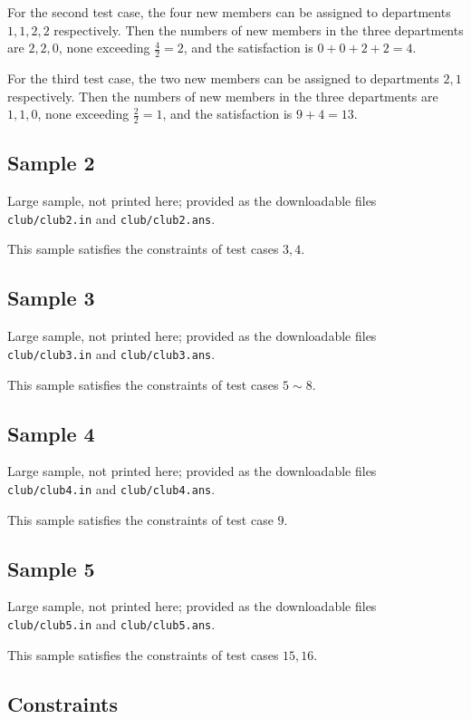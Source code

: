 \documentclass[11pt]{article}
\begin{document}
For the second test case, the four new members can be assigned to
departments $1, 1, 2, 2$ respectively.
Then the numbers of new members in the three departments are $2, 2, 0$,
none exceeding $\frac{4}{2} = 2$, and the satisfaction is
$0 + 0 + 2 + 2 = 4$.

For the third test case, the two new members can be assigned to
departments $2, 1$ respectively.
Then the numbers of new members in the three departments are $1, 1, 0$,
none exceeding $\frac{2}{2} = 1$, and the satisfaction is $9 + 4 = 13$.

\subsection*{Sample 2}

Large sample, not printed here;
provided as the downloadable files \texttt{club/club2.in} and \texttt{club/club2.ans}.

This sample satisfies the constraints of test cases $3, 4$.

\subsection*{Sample 3}

Large sample, not printed here;
provided as the downloadable files \texttt{club/club3.in} and \texttt{club/club3.ans}.

This sample satisfies the constraints of test cases $5 \sim 8$.

\subsection*{Sample 4}

Large sample, not printed here;
provided as the downloadable files \texttt{club/club4.in} and \texttt{club/club4.ans}.

This sample satisfies the constraints of test case $9$.

\subsection*{Sample 5}

Large sample, not printed here;
provided as the downloadable files \texttt{club/club5.in} and \texttt{club/club5.ans}.

This sample satisfies the constraints of test cases $15, 16$.

\subsection*{Constraints}
\end{document}
